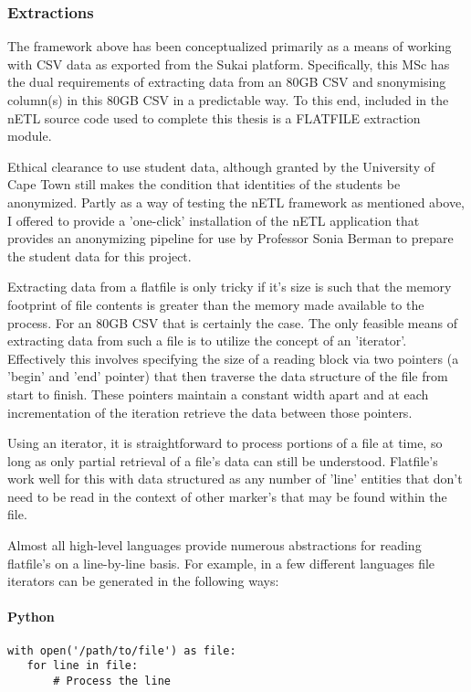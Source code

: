 \subsubsection{Extractions}
The framework above has been conceptualized primarily as a means of working with CSV data as exported from the Sukai platform. Specifically, this MSc has the dual requirements of extracting data from an 80GB CSV and snonymising column(s) in this 80GB CSV in a predictable way. To this end, included in the nETL source code used to complete this thesis is a FLATFILE extraction module.

Ethical clearance to use student data, although granted by the University of Cape Town still makes the condition that identities of the students be anonymized. Partly as a way of testing the nETL framework as mentioned above, I offered to provide a 'one-click' installation of the nETL application that provides an anonymizing pipeline for use by Professor Sonia Berman to prepare the student data for this project.

Extracting data from a flatfile is only tricky if it's size is such that the memory footprint of file contents is greater than the memory made available to the process. For an 80GB CSV that is certainly the case. The only feasible means of extracting data from such a file is to utilize the concept of an 'iterator'. Effectively this involves specifying the size of a reading block via two pointers (a 'begin' and 'end' pointer) that then traverse the data structure of the file from start to finish. These pointers maintain a constant width apart and at each incrementation of the iteration retrieve the data between those pointers.

Using an iterator, it is straightforward to process portions of a file at time, so long as only partial retrieval of a file's data can still be understood. Flatfile's work well for this with data structured as any number of 'line' entities that don't need to be read in the context of other marker's that may be found within the file.

Almost all high-level languages provide numerous abstractions for reading flatfile's on a line-by-line basis. For example, in a few different languages file iterators can be generated in the following ways:

\paragraph*{Python}
\begin{verbatim}
with open('/path/to/file') as file:
   for line in file:
       # Process the line
\end{verbatim}

